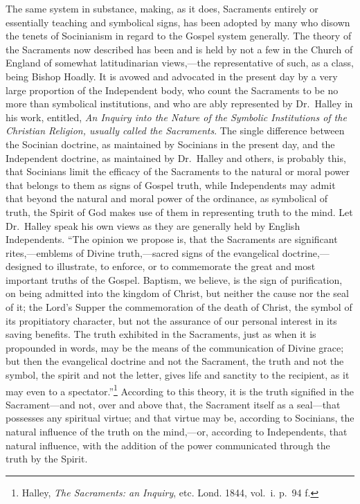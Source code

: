 \documentclass[english,]{book}
\begin{document}
The same system in substance, making, as it does, Sacraments entirely or essentially teaching and symbolical signs, has been adopted by many who disown the tenets of Socinianism in regard to the Gospel system generally. The theory of the Sacraments now described has been and is held by not a few in the Church of England of somewhat latitudinarian views,---the representative of such, as a class, being Bishop Hoadly. It is avowed and advocated in the present day by a very large proportion of the Independent body, who count the Sacraments to be no more than symbolical institutions, and who are ably represented by Dr.~Halley in his work, entitled, \emph{An Inquiry into the Nature of the Symbolic Institutions of the Christian Religion, usually called the Sacraments}. The single difference between the Socinian doctrine, as maintained by Socinians in the present day, and the Independent doctrine, as maintained by Dr.~Halley and others, is probably this, that Socinians limit the efficacy of the Sacraments to the natural or moral power that belongs to them as signs of Gospel truth, while Independents may admit that beyond the natural and moral power of the ordinance, as symbolical of truth, the Spirit of God makes use of them in representing truth to the mind. Let Dr.~Halley speak his own views as they are generally held by English Independents. ``The opinion we propose is, that the Sacraments are significant rites,---emblems of Divine truth,---sacred signs of the evangelical doctrine,---designed to illustrate, to enforce, or to commemorate the great and most important truths of the Gospel. Baptism, we believe, is the sign of purification, on being admitted into the kingdom of Christ, but neither the cause nor the seal of it; the Lord's Supper the commemoration of the death of Christ, the symbol of its propitiatory character, but not the assurance of our personal interest in its saving benefits. The truth exhibited in the Sacraments, just as when it is propounded in words, may be the means of the communication of Divine grace; but then the evangelical doctrine and not the Sacrament, the truth and not the symbol, the spirit and not the letter, gives life and sanctity to the recipient, as it may even to a spectator.''\footnote{Halley, \emph{The Sacraments: an Inquiry}, etc. Lond. 1844, vol.~i. p.~94 f.} According to this theory, it is the truth signified in the Sacrament---and not, over and above that, the Sacrament itself as a seal---that possesses any spiritual virtue; and that virtue may be, according to Socinians, the natural influence of the truth on the mind,---or, according to Independents, that natural influence, with the addition of the power communicated through the truth by the Spirit.
\end{document}
